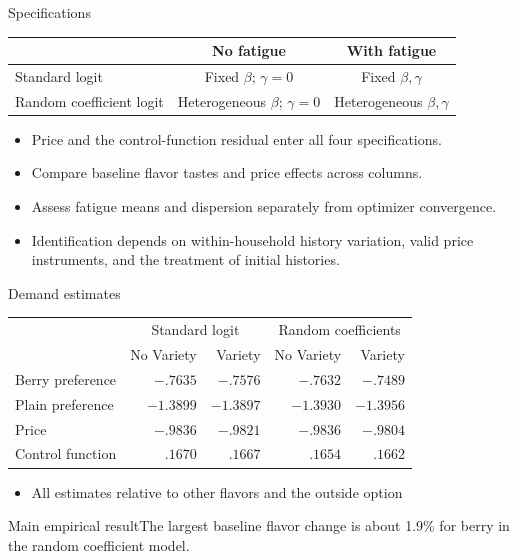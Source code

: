 \documentclass[aspectratio=169,11pt]{beamer}
\begin{document}
\begin{frame}[label=specifications]{Specifications}
\centering
\begin{tabular}{lcc}\toprule
 & No fatigue & With fatigue\\\midrule
Standard logit & Fixed $\beta$; $\gamma=0$ & Fixed $\beta,\gamma$\\[2mm]
Random coefficient logit & Heterogeneous $\beta$; $\gamma=0$ & Heterogeneous $\beta,\gamma$\\\bottomrule
\end{tabular}
\begin{itemize}
\item Price and the control-function residual enter all four specifications.
\item Compare baseline flavor tastes and price effects across columns.
\item Assess fatigue means and dispersion separately from optimizer convergence.
\item Identification depends on within-household history variation, valid price instruments, and the treatment of initial histories.
\end{itemize}
\par\smallskip
\hyperlink{panel-likelihood}{}
\end{frame}


\begin{frame}{Demand estimates}
\centering\small
\begin{tabular}{lrrrr}\toprule
& \multicolumn{2}{c}{Standard logit} & \multicolumn{2}{c}{Random coefficients}\\
& No Variety & Variety & No Variety & Variety\\\midrule
Berry preference & $-.7635$ & $-.7576$ & $-.7632$ & $-.7489$\\
Plain preference & $-1.3899$ & $-1.3897$ & $-1.3930$ & $-1.3956$\\
Price & $-.9836$ & $-.9821$ & $-.9836$ & $-.9804$\\
Control function & $.1670$ & $.1667$ & $.1654$ & $.1662$\\\bottomrule\end{tabular}
  \begin{itemize}
    \item All estimates relative to other flavors and the outside option
  \end{itemize}

\begin{block}{Main empirical result}The largest baseline flavor change is about 1.9\% for berry in the random coefficient model.\end{block}
\end{frame}
\end{document}
